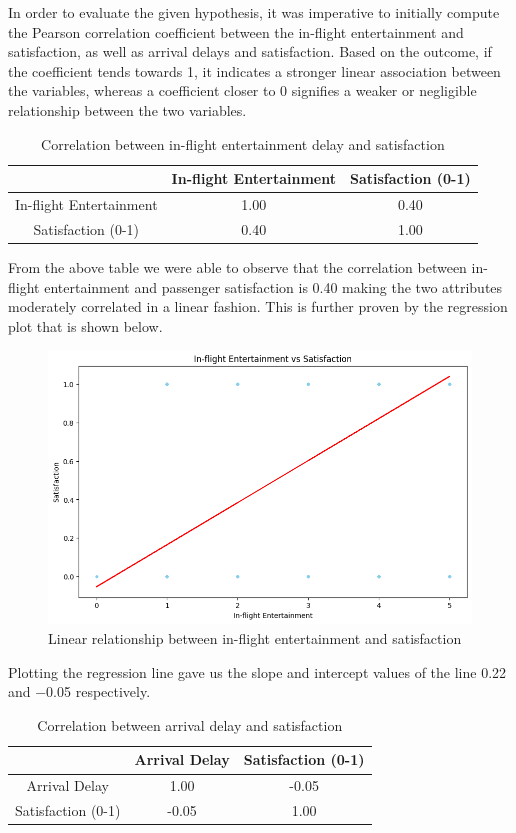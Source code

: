 \documentclass[11pt]{article}
\begin{document}
In order to evaluate the given hypothesis, it was imperative to initially compute the Pearson correlation coefficient between the in-flight entertainment and satisfaction, as well as arrival delays and satisfaction. Based on the outcome, if the coefficient tends towards 1, it indicates a stronger linear association between the variables, whereas a coefficient closer to 0 signifies a weaker or negligible relationship between the two variables.
        
\begin{table}[!h]
    \centering
    \begin{tabular}{|c|c|c|}
        \hline
        &  In-flight Entertainment & Satisfaction (0-1) \\
        \hline
        In-flight Entertainment     &   1.00  &  0.40 \\
        \hline
        Satisfaction (0-1)     &   0.40 & 1.00 \\
        \hline
    \end{tabular}
    \caption{Correlation between in-flight entertainment delay and satisfaction}
    \label{tab:corr-ife-s}
\end{table}

From the above table we were able to observe that the correlation between in-flight entertainment and passenger satisfaction is \num{0.40} making the two attributes moderately correlated in a linear fashion. This is further proven by the regression plot that is shown below.

    \begin{figure}[h]
\centering
\includegraphics[width=0.5\linewidth]{project_files/project_22_1.png}
\caption{Linear relationship between in-flight entertainment and satisfaction}
\end{figure}

Plotting the regression line gave us the slope and intercept values of the line \num{0.22} and \num{-0.05} respectively. 

\begin{table}[!h]
    \centering
    \begin{tabular}{|c|c|c|}
        \hline
        &  Arrival Delay & Satisfaction (0-1) \\
        \hline
        Arrival Delay     &   1.00  &  -0.05 \\
        \hline
        Satisfaction (0-1)     &   -0.05 & 1.00 \\
        \hline
    \end{tabular}
    \caption{Correlation between arrival delay and satisfaction}
    \label{tab:corr-arrd-s}
\end{table}
\end{document}
